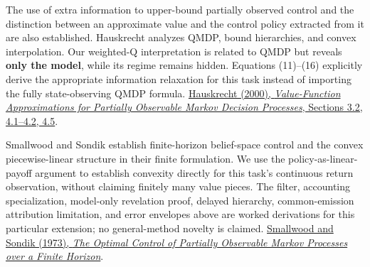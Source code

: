 \documentclass[10pt,a4paper]{article}
\begin{document}
The use of extra information to upper-bound partially observed control and
the distinction between an approximate value and the control policy extracted
from it are also established. Hauskrecht analyzes QMDP, bound hierarchies, and
convex interpolation. Our weighted-Q interpretation is related to QMDP but
reveals \textbf{only the model}, while its regime remains hidden. Equations
(11)--(16) explicitly derive the appropriate information relaxation for this
task instead of importing the fully state-observing QMDP formula.
\href{https://jair.org/index.php/jair/article/download/10262/24449}{Hauskrecht (2000), \emph{Value-Function Approximations for Partially Observable Markov Decision Processes}, Sections 3.2, 4.1--4.2, 4.5}.

Smallwood and Sondik establish finite-horizon belief-space control and the
convex piecewise-linear structure in their finite formulation. We use the
policy-as-linear-payoff argument to establish convexity directly for this
task's continuous return observation, without claiming finitely many value
pieces. The filter, accounting specialization, model-only revelation proof,
delayed hierarchy, common-emission attribution limitation, and error envelopes
above are worked derivations for this particular extension; no general-method
novelty is claimed.
\href{https://pubsonline.informs.org/doi/10.1287/opre.21.5.1071}{Smallwood and Sondik (1973), \emph{The Optimal Control of Partially Observable Markov Processes over a Finite Horizon}}.
\end{document}
